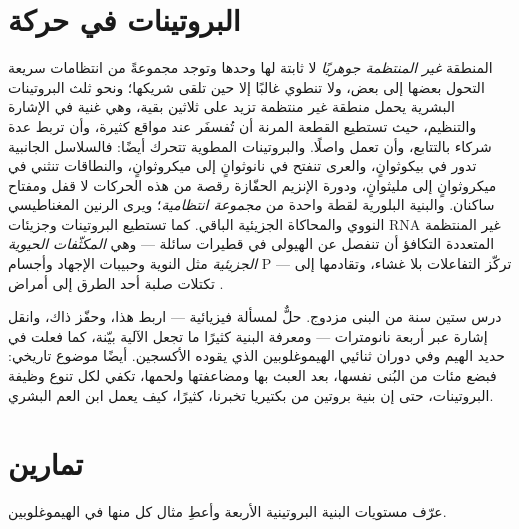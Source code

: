 \section{البروتينات في حركة}

\begin{definition}\label{def:b3:structural-biology:disorder}
المنطقة \emph{غير المنتظمة جوهريًا} لا  ثابتة لها وحدها
وتوجد مجموعةً من انتظامات سريعة التحول بعضها إلى بعض،
ولا تنطوي غالبًا إلا حين تلقى شريكها؛ ونحو ثلث البروتينات
البشرية يحمل منطقة غير منتظمة تزيد على ثلاثين بقية، وهي
غنية في الإشارة والتنظيم، حيث تستطيع القطعة المرنة
أن تُفسفَر عند مواقع كثيرة، وأن تربط عدة شركاء بالتتابع، وأن
تعمل واصلًا. والبروتينات المطوية تتحرك أيضًا: فالسلاسل الجانبية
تدور في بيكوثوانٍ، والعرى تنفتح في نانوثوانٍ إلى ميكروثوانٍ،
والنطاقات تنثني في ميكروثوانٍ إلى مليثوانٍ، ودورة الإنزيم
الحفّازة رقصة من هذه الحركات لا قفل ومفتاح
ساكنان. والبنية البلورية لقطة واحدة من
\emph{مجموعة انتظامية}؛ ويرى الرنين المغناطيسي النووي والمحاكاة الجزيئية
الباقي. كما تستطيع البروتينات وجزيئات RNA غير المنتظمة المتعددة التكافؤ أن تنفصل عن
الهيولى في قطيرات سائلة --- وهي \emph{المكثّفات الحيوية الجزيئية} مثل
النوية وحبيبات الإجهاد وأجسام P --- تركّز التفاعلات
بلا غشاء، وتقادمها إلى تكتلات صلبة أحد الطرق
إلى أمراض .
\end{definition}

\begin{remark}\label{rem:b3:structural-biology:sf}
درس ستين سنة من البنى مزدوج. 
حلٌّ لمسألة فيزيائية --- اربط هذا، وحفّز ذاك، وانقل
إشارة عبر أربعة نانومترات --- ومعرفة البنية كثيرًا ما تجعل
الآلية بيّنة، كما فعلت في حديد الهيم وفي
دوران ثنائيي الهيموغلوبين الذي يقوده الأكسجين.  أيضًا
موضوع تاريخي: فبضع مئات من البُنى نفسها، بعد العبث بها
ومضاعفتها ولحمها، تكفي لكل تنوع وظيفة
البروتينات، حتى إن بنية بروتين من بكتيريا تخبرنا،
كثيرًا، كيف يعمل ابن العم البشري.
\end{remark}

\section{تمارين}

\begin{exercise}[$\star$]\label{exo:b3:structural-biology:1}
عرّف مستويات البنية البروتينية الأربعة وأعطِ مثال كل منها
في الهيموغلوبين.
\end{exercise}

